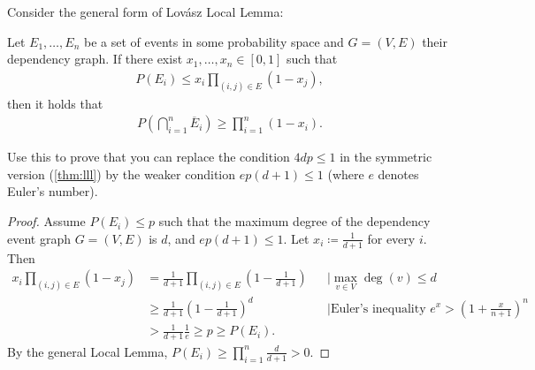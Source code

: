 \begin{aufgabe}
	Consider the general form of Lovász Local Lemma:
	\begin{theorem}
		Let $E_1, \dots, E_n$ be a set of events in some probability space and $G=(V,E)$ their dependency graph.
		If there exist $x_1, \dots, x_n \in [0,1]$ such that
		\begin{align*}
			P(E_i) \leq x_i \prod_{(i,j)\in E}(1-x_j),
		\end{align*}
		then it holds that
		\begin{align*}
			P\left(\bigcap_{i=1}^n \overline{E}_i\right) \geq \prod_{i=1}^{n}(1-x_i).
		\end{align*}
	\end{theorem}
	Use this to prove that you can replace the condition $4dp \leq 1$ in the symmetric version (\autoref{thm:lll}) by the weaker condition $ep(d+1)\leq 1$ (where $e$ denotes Euler's number).
	\begin{proof}
		Assume $P(E_i) \leq p$ such that the maximum degree of the dependency event graph $G=(V,E)$ is $d$, and $ep(d+1) \leq 1$.
		Let $x_i \coloneqq \frac{1}{d+1}$ for every $i$. Then
		\begin{align*}
			x_i \prod_{(i,j)\in E}(1-x_j) &= \frac{1}{d+1}\prod_{(i,j)\in E}\left(1-\frac{1}{d+1}\right) &&\mid \max_{v\in V} \deg(v) \leq d\\
			&\geq \frac{1}{d+1}\left(1-\frac{1}{d+1}\right)^d && \mid \text{Euler's inequality } e^x > \left(1 + \frac{x}{n+1}\right)^n\\
			&>  \frac{1}{d+1} \frac{1}{e} \geq p \geq P(E_i).
		\end{align*}
		By the general Local Lemma, $P(E_i) \geq \prod_{i=1}^{n}\frac{d}{d+1} > 0$.
	\end{proof}
\end{aufgabe}

